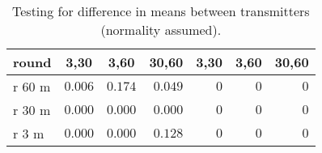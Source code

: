 %
\begin{table}[!tbp]
\caption{Testing for difference in means between transmitters (normality assumed).\label{tab:pvals}} 
\begin{center}
\begin{tabular}{lrrrrrr}
\hline\hline
\multicolumn{1}{l}{round}&\multicolumn{1}{c}{3,30}&\multicolumn{1}{c}{3,60}&\multicolumn{1}{c}{30,60}&\multicolumn{1}{c}{3,30}&\multicolumn{1}{c}{3,60}&\multicolumn{1}{c}{30,60}\tabularnewline
\hline
r 60 m&$0.006$&$0.174$&$0.049$&$0$&$0$&$0$\tabularnewline
r 30 m&$0.000$&$0.000$&$0.000$&$0$&$0$&$0$\tabularnewline
r 3 m&$0.000$&$0.000$&$0.128$&$0$&$0$&$0$\tabularnewline
\hline
\end{tabular}
\end{center}
\end{table}

